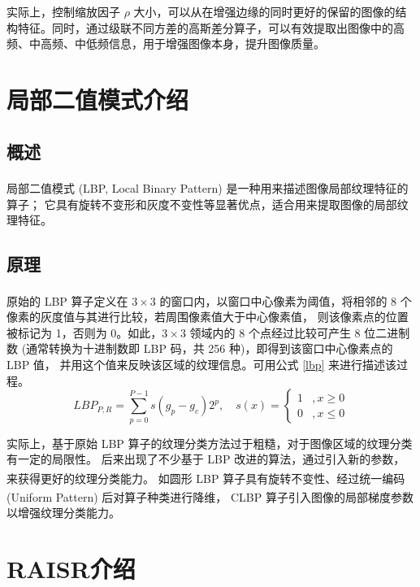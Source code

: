 \documentclass[12pt, a4paper, oneside]{ctexbook}
\begin{document}
		实际上，控制缩放因子 $\rho$ 大小，可以从在增强边缘的同时更好的保留的图像的结构特征。同时，通过级联不同方差的高斯差分算子，可以有效提取出图像中的高频、中高频、中低频信息，用于增强图像本身，提升图像质量。
	
	\section{局部二值模式介绍}
		\subsection{概述}
		局部二值模式 (LBP, Local Binary Pattern)\textsuperscript{\cite{8}}\textsuperscript{\cite{9}}\textsuperscript{\cite{13}} 是一种用来描述图像局部纹理特征的算子；
		它具有旋转不变形和灰度不变性等显著优点，适合用来提取图像的局部纹理特征。	
		\subsection{原理}
		原始的 LBP 算子\textsuperscript{\cite{13}}定义在 $3\times3$ 的窗口内，以窗口中心像素为阈值，将相邻的 8 个像素的灰度值与其进行比较，若周围像素值大于中心像素值，
		则该像素点的位置被标记为 1，否则为 0。如此，$3\times3$ 领域内的 8 个点经过比较可产生 8 位二进制数 (通常转换为十进制数即 LBP 码，共 256 种)，即得到该窗口中心像素点的 LBP 值，
		并用这个值来反映该区域的纹理信息。可用公式 \ref{lbp} 来进行描述该过程。
		\begin{equation}
			LBP_{P,R}=\sum_{p=0}^{P-1}s(g_p-g_c)2^{p},\quad s(x)=\begin{cases}
				1  &,x\geq0\\
				0  &,x\le0 
			\end{cases}
			\label{lbp}
		\end{equation}
		\par
		实际上，基于原始 LBP 算子的纹理分类方法过于粗糙，对于图像区域的纹理分类有一定的局限性。
		后来出现了不少基于 LBP 改进的算法，通过引入新的参数，来获得更好的纹理分类能力。
		如圆形 LBP 算子\textsuperscript{\cite{8}}具有旋转不变性、经过统一编码 (Uniform Pattern) 后对算子种类进行降维，
		CLBP 算子\textsuperscript{\cite{9}}引入图像的局部梯度参数以增强纹理分类能力。
	\section{RAISR介绍}
\end{document}

